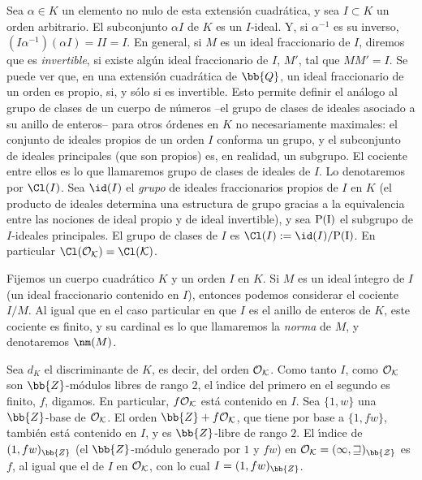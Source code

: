 Sea $\alpha\in K$ un elemento no nulo de esta extensi\'{o}n
cuadr\'{a}tica, y sea $I\subset K$ un orden arbitrario. El
subconjunto $\alpha I$ de $K$ es un $I$-ideal. Y, si $\alpha^{-1}$ es
su inverso, $(I\alpha^{-1})(\alpha I)=II=I$. En general, si $M$ es
un ideal fraccionario de $I$, diremos que es \emph{invertible}, si
existe alg\'{u}n ideal fraccionario de $I$, $M'$, tal que
$MM'=I$. Se puede ver que, en una extensi\'{o}n cuadr\'{a}tica de
$\bb{Q}$, un ideal fraccionario de un orden es propio, si, y s\'{o}lo
si es invertible. Esto permite definir el an\'{a}logo al grupo de
clases de un cuerpo de n\'{u}meros --el grupo de clases de ideales
asociado a su anillo de enteros-- para otros \'{o}rdenes en $K$ no
necesariamente maximales: el conjunto de ideales propios de un orden
$I$ conforma un grupo, y el subconjunto de ideales principales
(que son propios) es, en realidad, un subgrupo. El cociente entre
ellos es lo que llamaremos grupo de clases de ideales de $I$. Lo
denotaremos por $\Cl(I)$. Sea $\id(I)$ el \emph{grupo} de ideales
fraccionarios propios de $I$ en $K$ (el producto de ideales determina
una estructura de grupo gracias a la equivalencia entre las nociones
de ideal propio y de ideal invertible), y sea $\rm{P}(I)$ el subgrupo
de $I$-ideales principales. El grupo de clases de $I$ es
$\Cl(I):=\id(I)/\rm{P}(I)$. En particular $\Cl(\cal{O}_{K})=\Cl(K)$.

Fijemos un cuerpo cuadr\'{a}tico $K$ y un orden $I$ en $K$.
Si $M$ es un ideal \'{\i}ntegro de $I$ (un ideal fraccionario
contenido en $I$), entonces podemos considerar el cociente
$I/M$. Al igual que en el caso particular en que $I$ es el
anillo de enteros de $K$, este cociente es finito, y su cardinal
es lo que llamaremos la \emph{norma} de $M$, y denotaremos $\nm(M)$.

Sea $d_{K}$ el discriminante de $K$, es decir, del orden $\cal{O}_{K}$.
Como tanto $I$, como $\cal{O}_{K}$ son $\bb{Z}$-m\'{o}dulos libres
de rango $2$, el \'{\i}ndice del primero en el segundo es finito, $f$,
digamos. En particular, $f\cal{O}_{K}$ est\'{a} contenido en $I$.
Sea $\{1,w\}$ una $\bb{Z}$-base de $\cal{O}_{K}$. El orden
$\bb{Z}+f\cal{O}_{K}$, que tiene por base a $\{1,fw\}$,
tambi\'{e}n est\'{a} contenido en $I$, y es $\bb{Z}$-libre de rango
$2$. El \'{\i}ndice de $(1,fw)_{\bb{Z}}$
(el $\bb{Z}$-m\'{o}dulo generado por $1$ y $fw$) en
$\cal{O}_{K}=(1,w)_{\bb{Z}}$ es $f$, al igual que el de $I$ en
$\cal{O}_{K}$, con lo cual $I=(1,fw)_{\bb{Z}}$.

